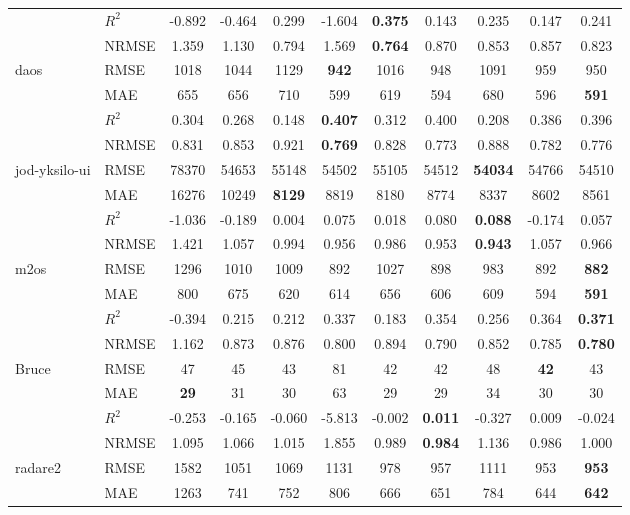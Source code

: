 \documentclass[conference]{IEEEconf}
\begin{document}
\begin{table}[!tbp]
\begin{tabular}{llccccccccc}
  & $R^2$ & -0.892 & -0.464 & 0.299 & -1.604 & \textbf{0.375} & 0.143 & 0.235 & 0.147 & 0.241 \\
  & NRMSE & 1.359 & 1.130 & 0.794 & 1.569 & \textbf{0.764} & 0.870 & 0.853 & 0.857 & 0.823 \\
\midrule
\multirow{4}{*}{daos} & RMSE & 1018 & 1044 & 1129 & \textbf{942} & 1016 & 948 & 1091 & 959 & 950 \\
  & MAE & 655 & 656 & 710 & 599 & 619 & 594 & 680 & 596 & \textbf{591} \\
  & $R^2$ & 0.304 & 0.268 & 0.148 & \textbf{0.407} & 0.312 & 0.400 & 0.208 & 0.386 & 0.396 \\
  & NRMSE & 0.831 & 0.853 & 0.921 & \textbf{0.769} & 0.828 & 0.773 & 0.888 & 0.782 & 0.776 \\
\midrule
\multirow{4}{*}{jod-yksilo-ui} & RMSE & 78370 & 54653 & 55148 & 54502 & 55105 & 54512 & \textbf{54034} & 54766 & 54510 \\
  & MAE & 16276 & 10249 & \textbf{8129} & 8819 & 8180 & 8774 & 8337 & 8602 & 8561 \\
  & $R^2$ & -1.036 & -0.189 & 0.004 & 0.075 & 0.018 & 0.080 & \textbf{0.088} & -0.174 & 0.057 \\
  & NRMSE & 1.421 & 1.057 & 0.994 & 0.956 & 0.986 & 0.953 & \textbf{0.943} & 1.057 & 0.966 \\
\midrule
\multirow{4}{*}{m2os} & RMSE & 1296 & 1010 & 1009 & 892 & 1027 & 898 & 983 & 892 & \textbf{882} \\
  & MAE & 800 & 675 & 620 & 614 & 656 & 606 & 609 & 594 & \textbf{591} \\
  & $R^2$ & -0.394 & 0.215 & 0.212 & 0.337 & 0.183 & 0.354 & 0.256 & 0.364 & \textbf{0.371} \\
  & NRMSE & 1.162 & 0.873 & 0.876 & 0.800 & 0.894 & 0.790 & 0.852 & 0.785 & \textbf{0.780} \\
\midrule
\multirow{4}{*}{Bruce} & RMSE & 47 & 45 & 43 & 81 & 42 & 42 & 48 & \textbf{42} & 43 \\
  & MAE & \textbf{29} & 31 & 30 & 63 & 29 & 29 & 34 & 30 & 30 \\
  & $R^2$ & -0.253 & -0.165 & -0.060 & -5.813 & -0.002 & \textbf{0.011} & -0.327 & 0.009 & -0.024 \\
  & NRMSE & 1.095 & 1.066 & 1.015 & 1.855 & 0.989 & \textbf{0.984} & 1.136 & 0.986 & 1.000 \\
\midrule
\multirow{4}{*}{radare2} & RMSE & 1582 & 1051 & 1069 & 1131 & 978 & 957 & 1111 & 953 & \textbf{953} \\
  & MAE & 1263 & 741 & 752 & 806 & 666 & 651 & 784 & 644 & \textbf{642} \\

\end{tabular}
\end{table}
\end{document}
